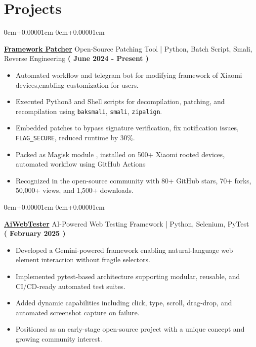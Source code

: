 \documentclass[10pt,a4paper]{article}
\newenvironment{highlights}{
    \begin{itemize}[
        topsep=0.10cm,
        parsep=0.10cm,
        partopsep=0pt,
        itemsep=0pt,
        leftmargin=10pt,
    ]
    }{
    \end{itemize}
}
\newenvironment{onecolentry}{
    \begin{adjustwidth}{
        0cm+0.00001cm
    }{
        0cm+0.00001cm
    }
    }{
    \end{adjustwidth}
}
\begin{document}
    \section{Projects}\label{sec:projects}
    \begin{onecolentry}
        \textbf{\href{https://github.com/Jefino9488/FrameworkPatcher}{Framework Patcher}} Open-Source Patching Tool | Python, Batch Script, Smali, Reverse Engineering \hfill \textbf{( June 2024 - Present )} \\
        \begin{highlights}
            \item Automated workflow and telegram bot for modifying framework of Xiaomi devices,enabling customization for users. \\
            \item Executed Python3 and Shell scripts for decompilation, patching, and recompilation using \texttt{baksmali}, \texttt{smali}, \texttt{zipalign}.\\
            \item Embedded patches to bypass signature verification, fix notification issues, \texttt{FLAG\_SECURE}, reduced runtime by 30\%. \\
            \item Packed as Magisk module , installed on 500+ Xiaomi rooted devices, automated workflow using GitHub Actions \\
            \item Recognized in the open-source community with 80+ GitHub stars, 70+ forks, 50,000+ views, and 1,500+ downloads. \\
        \end{highlights}
    \end{onecolentry}
    \vspace{0.1cm}
    \begin{onecolentry}
        \textbf{\href{https://github.com/Jefino9488/AiWebTester}{AiWebTester}} AI-Powered Web Testing Framework | Python, Selenium, PyTest \hfill \textbf{( February 2025 )} \\
        \begin{highlights}
            \item Developed a Gemini-powered framework enabling natural-language web element interaction without fragile selectors. \\
            \item Implemented pytest-based architecture supporting modular, reusable, and CI/CD-ready automated test suites. \\
            \item Added dynamic capabilities including click, type, scroll, drag-drop, and automated screenshot capture on failure. \\
            \item Positioned as an early-stage open-source project with a unique concept and growing community interest. \\
        \end{highlights}
    \end{onecolentry}
\end{document}
